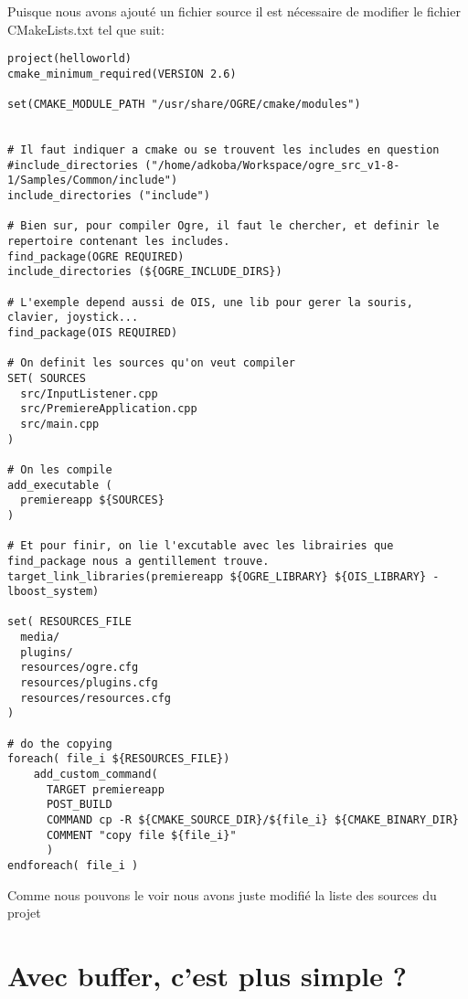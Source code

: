 Puisque nous avons ajouté un fichier source il est nécessaire de modifier le fichier CMakeLists.txt tel que suit:

\begin{lstlisting}[caption={CMakeLists.txt}]
project(helloworld)
cmake_minimum_required(VERSION 2.6)

set(CMAKE_MODULE_PATH "/usr/share/OGRE/cmake/modules")


# Il faut indiquer a cmake ou se trouvent les includes en question
#include_directories ("/home/adkoba/Workspace/ogre_src_v1-8-1/Samples/Common/include")
include_directories ("include")

# Bien sur, pour compiler Ogre, il faut le chercher, et definir le repertoire contenant les includes.
find_package(OGRE REQUIRED)
include_directories (${OGRE_INCLUDE_DIRS})

# L'exemple depend aussi de OIS, une lib pour gerer la souris, clavier, joystick...
find_package(OIS REQUIRED)

# On definit les sources qu'on veut compiler
SET( SOURCES
  src/InputListener.cpp  
  src/PremiereApplication.cpp
  src/main.cpp
)

# On les compile
add_executable (
  premiereapp ${SOURCES}
)

# Et pour finir, on lie l'excutable avec les librairies que find_package nous a gentillement trouve.
target_link_libraries(premiereapp ${OGRE_LIBRARY} ${OIS_LIBRARY} -lboost_system)

set( RESOURCES_FILE
  media/
  plugins/
  resources/ogre.cfg
  resources/plugins.cfg
  resources/resources.cfg
)

# do the copying
foreach( file_i ${RESOURCES_FILE})
    add_custom_command(
      TARGET premiereapp
      POST_BUILD
      COMMAND cp -R ${CMAKE_SOURCE_DIR}/${file_i} ${CMAKE_BINARY_DIR}
      COMMENT "copy file ${file_i}"
      )
endforeach( file_i )
\end{lstlisting}

Comme nous pouvons le voir nous avons juste modifié la liste des sources du projet












\section{Avec buffer, c'est plus simple ?}

